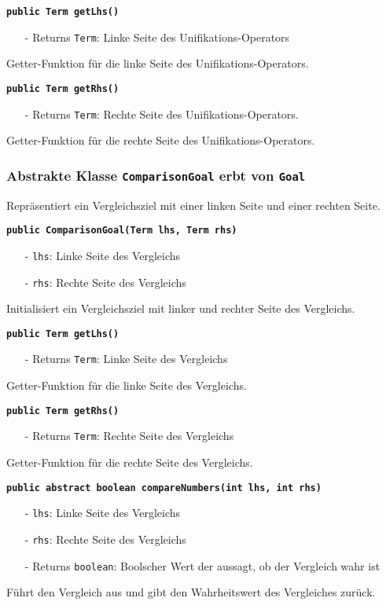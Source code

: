 \documentclass[parskip=full,11pt,twoside]{scrartcl}
\begin{document}
\textbf{\texttt{public Term getLhs()}}
\begin{itemize}[noitemsep]
	\item[-] Returns \texttt{Term}: Linke Seite des Unifikations-Operators
\end{itemize}
Getter-Funktion für die linke Seite des Unifikations-Operators.

\textbf{\texttt{public Term getRhs()}}
\begin{itemize}[noitemsep]
	\item[-] Returns \texttt{Term}: Rechte Seite des Unifikations-Operators.
\end{itemize}
Getter-Funktion für die rechte Seite des Unifikations-Operators.

\subsubsection{Abstrakte Klasse \texttt{ComparisonGoal} erbt von \texttt{Goal}}
Repräsentiert ein Vergleichsziel mit einer linken Seite und einer rechten Seite.

\textbf{\texttt{public ComparisonGoal(Term lhs, Term rhs)}}
\begin{itemize}[noitemsep]
	\item[-] \texttt{lhs}: Linke Seite des Vergleichs
	\item[-] \texttt{rhs}: Rechte Seite des Vergleichs
\end{itemize}
Initialisiert ein Vergleichsziel mit linker und rechter Seite des Vergleichs.

\textbf{\texttt{public Term getLhs()}}
\begin{itemize}[noitemsep]
	\item[-] Returns \texttt{Term}: Linke Seite des Vergleichs
\end{itemize}
Getter-Funktion für die linke Seite des Vergleichs.

\textbf{\texttt{public Term getRhs()}}
\begin{itemize}[noitemsep]
	\item[-] Returns \texttt{Term}: Rechte Seite des Vergleichs
\end{itemize}
Getter-Funktion für die rechte Seite des Vergleichs.

\textbf{\texttt{public abstract boolean compareNumbers(int lhs, int rhs)}}
\begin{itemize}[noitemsep]
	\item[-] \texttt{lhs}: Linke Seite des Vergleichs
	\item[-] \texttt{rhs}: Rechte Seite des Vergleichs
	\item[-] Returns \texttt{boolean}: Boolscher Wert der aussagt, ob der Vergleich wahr ist
\end{itemize}
Führt den Vergleich aus und gibt den Wahrheitswert des Vergleiches zurück.
\end{document}
